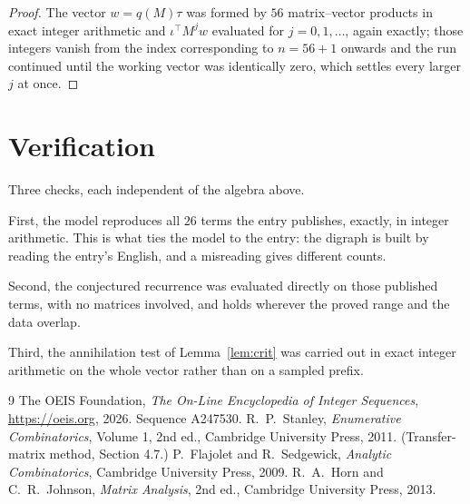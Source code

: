 \documentclass[11pt,a4paper]{article}
\theoremstyle{plain}
\theoremstyle{definition}
\begin{document}
\begin{proof}
The vector $w=q(M)\tau$ was formed by $56$ matrix--vector products in exact integer
arithmetic and $\iota^{\!\top}M^{j}w$ evaluated for $j=0,1,\dots$, again exactly; those
integers vanish from the index corresponding to $n=56+1$ onwards and the run continued
until the working vector was identically zero, which settles every larger $j$ at once.
\end{proof}

\section{Verification}

Three checks, each independent of the algebra above.

First, the model reproduces all $26$ terms the entry publishes, exactly, in integer
arithmetic. This is what ties the model to the entry: the digraph is built by reading the
entry's English, and a misreading gives different counts.

Second, the conjectured recurrence was evaluated directly on those published terms, with no
matrices involved, and holds wherever the proved range and the data overlap.

Third, the annihilation test of Lemma~\ref{lem:crit} was carried out in exact integer
arithmetic on the whole vector rather than on a sampled prefix.

\begin{thebibliography}{9}
 The OEIS Foundation, \emph{The On-Line Encyclopedia of Integer
Sequences}, \url{https://oeis.org}, 2026. Sequence A247530.
 R.~P.~Stanley, \emph{Enumerative Combinatorics}, Volume 1, 2nd ed.,
Cambridge University Press, 2011. (Transfer-matrix method, Section 4.7.)
 P.~Flajolet and R.~Sedgewick, \emph{Analytic Combinatorics}, Cambridge
University Press, 2009.
 R.~A.~Horn and C.~R.~Johnson, \emph{Matrix Analysis}, 2nd ed., Cambridge
University Press, 2013.
\end{thebibliography}
\end{document}
